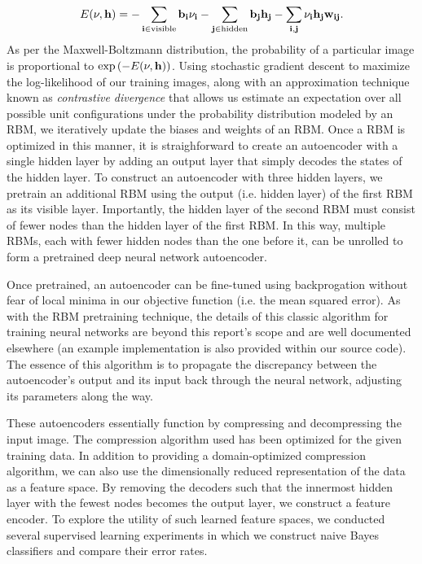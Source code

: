 \documentclass{article}
\begin{document}
\begin{equation}
E(\bf{\nu}, \bf{h}) = -\sum_{i\in\mathrm{visible}}{b_i\nu_i} - \sum_{j\in\mathrm{hidden}}{b_jh_j - \sum_{i,j}{\nu_ih_jw_{ij}}}.
\end{equation}
As per the Maxwell-Boltzmann distribution, the probability of a particular image is proportional to $\mathrm{exp}\left(-E(\bf{\nu}, \bf{h})\right)$. Using stochastic gradient descent to maximize the log-likelihood of our training images, along with an approximation technique known as {\em contrastive divergence} that allows us estimate an expectation over all possible unit configurations under the probability distribution modeled by an RBM, we iteratively update the biases and weights of an RBM. Once a RBM is optimized in this manner, it is straighforward to create an autoencoder with a single hidden layer by adding an output layer that simply decodes the states of the hidden layer. To construct an autoencoder with three hidden layers, we pretrain an additional RBM using the output (i.e. hidden layer) of the first RBM as its visible layer. Importantly, the hidden layer of the second RBM must consist of fewer nodes than the hidden layer of the first RBM. In this way, multiple RBMs, each with fewer hidden nodes than the one before it, can be unrolled to form a pretrained deep neural network autoencoder.

Once pretrained, an autoencoder can be fine-tuned using backprogation without fear of local minima in our objective function (i.e. the mean squared error). As with the RBM pretraining technique, the details of this classic algorithm for training neural networks are beyond this report's scope and are well documented elsewhere (an example implementation is also provided within our source code). The essence of this algorithm is to propagate the discrepancy between the autoencoder's output and its input back through the neural network, adjusting its parameters along the way.

These autoencoders essentially function by compressing and decompressing the input image. The compression algorithm used has been optimized for the given training data. In addition to providing a domain-optimized compression algorithm, we can also use the dimensionally reduced representation of the data as a feature space. By removing the decoders such that the innermost hidden layer with the fewest nodes becomes the output layer, we construct a feature encoder. To explore the utility of such learned feature spaces, we conducted several supervised learning experiments in which we construct naive Bayes classifiers and compare their error rates.
\end{document}
